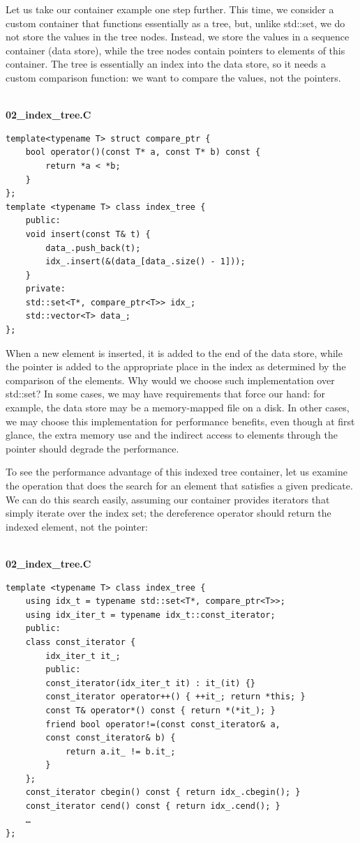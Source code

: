 Let us take our container example one step further. This time, we consider a custom container that functions essentially as a tree, but, unlike std::set, we do not store the values in the tree nodes. Instead, we store the values in a sequence container (data store), while the tree nodes contain pointers to elements of this container. The tree is essentially an index into the data store, so it needs a custom comparison function: we want to compare the values, not the pointers.

\hspace*{\fill} \\ %
\noindent
\textbf{02\_index\_tree.C}
\begin{lstlisting}[style=styleCXX]
template<typename T> struct compare_ptr {
	bool operator()(const T* a, const T* b) const {
		return *a < *b;
	}
};
template <typename T> class index_tree {
	public:
	void insert(const T& t) { 
		data_.push_back(t);
		idx_.insert(&(data_[data_.size() - 1]));
	}
	private:
	std::set<T*, compare_ptr<T>> idx_;
	std::vector<T> data_;
};
\end{lstlisting}

When a new element is inserted, it is added to the end of the data store, while the pointer is added to the appropriate place in the index as determined by the comparison of the elements. Why would we choose such implementation over std::set? In some cases, we may have requirements that force our hand: for example, the data store may be a memory-mapped file on a disk. In other cases, we may choose this implementation for performance benefits, even though at first glance, the extra memory use and the indirect access to elements through the pointer should degrade the performance. 

To see the performance advantage of this indexed tree container, let us examine the operation that does the search for an element that satisfies a given predicate. We can do this search easily, assuming our container provides iterators that simply iterate over the index set; the dereference operator should return the indexed element, not the pointer:

\hspace*{\fill} \\ %
\noindent
\textbf{02\_index\_tree.C}
\begin{lstlisting}[style=styleCXX]
template <typename T> class index_tree {
	using idx_t = typename std::set<T*, compare_ptr<T>>;
	using idx_iter_t = typename idx_t::const_iterator;
	public:
	class const_iterator {
		idx_iter_t it_;
		public:
		const_iterator(idx_iter_t it) : it_(it) {}
		const_iterator operator++() { ++it_; return *this; }
		const T& operator*() const { return *(*it_); }
		friend bool operator!=(const const_iterator& a,
		const const_iterator& b) {
			return a.it_ != b.it_;
		}
	};
	const_iterator cbegin() const { return idx_.cbegin(); }
	const_iterator cend() const { return idx_.cend(); }
	…
};
\end{lstlisting}

